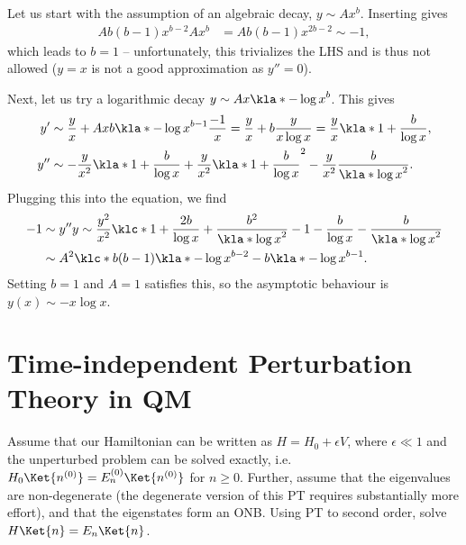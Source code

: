 \documentclass[english, parskip=full]{scrartcl}
\begin{document}
Let us start with the assumption of an algebraic decay, $y\sim Ax^b$.
Inserting gives
\begin{align}
Ab(b-1)x^{b-2} Ax^b &= Ab(b-1) x^{2b-2} \sim -1,
\end{align}
which leads to $b=1$ -- unfortunately, this trivializes the LHS and is thus not allowed ($y=x$ is not a good approximation as $y''=0$).

Next, let us try a logarithmic decay $y\sim Ax \kla*{-\log x}^b$.
This gives
\begin{align}
y' &\sim \frac{y}{x} + Ax b \kla*{-\log x}^{b-1} \frac{-1}{x} = \frac{y}{x} + b\frac{y}{x\log x} = \frac{y}{x} \kla*{1 + \frac{b}{\log x}},\\
y'' &\sim -\frac{y}{x^2} \kla*{1 + \frac{b}{\log x}} + \frac{y}{x^2} \kla*{1 + \frac{b}{\log x}}^2 - \frac{y}{x^2} \frac{b}{\kla*{\log x}^2}.
\end{align}
Plugging this into the equation, we find
\begin{align}
-1 &\sim y'' y \sim \frac{y^2}{x^2} \klc*{1 + \frac{2b}{\log x} + \frac{b^2}{\kla*{\log x}^2} - 1 - \frac{b}{\log x} - \frac{b}{\kla*{\log x}^2}}\\
&\sim A^2 \klc*{b(b-1) \kla*{-\log x}^{b-2} - b\kla*{-\log x}^{b-1}}.
\end{align}
Setting $b=1$ and $A=1$ satisfies this, so the asymptotic behaviour is $y(x) \sim -x\log x$.
\section{Time-independent Perturbation Theory in QM}
Assume that our Hamiltonian can be written as $H=H_0+\epsilon V$, where $\epsilon\ll 1$ and the unperturbed problem can be solved exactly, i.e. $H_0\Ket{n^{(0)}} = E_n^{(0)} \Ket{n^{(0)}}$ for $n\ge 0$.
Further, assume that the eigenvalues are non-degenerate (the degenerate version of this PT requires substantially more effort), and that the eigenstates form an ONB.
Using PT to second order, solve $H\Ket{n} = E_n\Ket{n}$.
\end{document}
